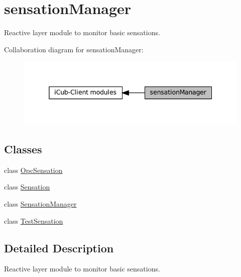 \hypertarget{group__sensationManager}{}\section{sensation\+Manager}
\label{group__sensationManager}


Reactive layer module to monitor basic sensations.  


Collaboration diagram for sensation\+Manager\+:
\nopagebreak
\begin{figure}[H]
\begin{center}
\leavevmode
\includegraphics[width=338pt]{group__sensationManager}
\end{center}
\end{figure}
\subsection*{Classes}
\begin{DoxyCompactItemize}
\item 
class \hyperlink{group__sensationManager_classOpcSensation}{Opc\+Sensation}
\item 
class \hyperlink{group__sensationManager_classSensation}{Sensation}
\item 
class \hyperlink{group__sensationManager_classSensationManager}{Sensation\+Manager}
\item 
class \hyperlink{group__sensationManager_classTestSensation}{Test\+Sensation}
\end{DoxyCompactItemize}


\subsection{Detailed Description}
Reactive layer module to monitor basic sensations. 

